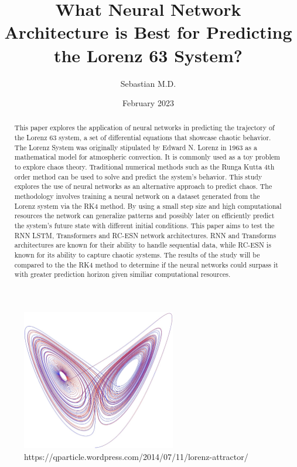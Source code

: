 \documentclass[11pt]{article}
\title{What Neural Network Architecture is Best for Predicting the Lorenz 63 System?}
\author{Sebastian M.D.}
\date{February 2023}
\begin{document}
\maketitle

\begin{abstract}
This paper explores the application of neural networks in predicting the trajectory of the Lorenz 63 system, a set of differential equations that showcase chaotic behavior. The Lorenz System was originally stipulated by Edward N. Lorenz in 1963 as a mathematical model for atmospheric convection. It is commonly used as a toy problem to explore chaos theory. Traditional numerical methods such as the Runga Kutta 4th order method can be used to solve and predict the system's behavior. This study explores the use of neural networks as an alternative approach to predict chaos. The methodology involves training a neural network on a dataset generated from the Lorenz system via the RK4 method. By using a small step size and high computational resources the network can generalize patterns and possibly later on efficiently predict the system's future state with different initial conditions. This paper aims to test the RNN LSTM, Transformers and RC-ESN network architectures. RNN and Transforms architectures are known for their ability to handle sequential data, while RC-ESN is known for its ability to capture chaotic systems. The results of the study will be compared to the the RK4 method to determine if the neural networks could surpass it with greater prediction horizon given similiar computational resources.

\end{abstract}
\begin{figure}[h]
\centering
\includegraphics[width=0.6\textwidth]{lorenz_test.jpeg}
\caption{https://qparticle.wordpress.com/2014/07/11/lorenz-attractor/}
\end{figure}
\newpage
\tableofcontents
\newpage
\end{document}
